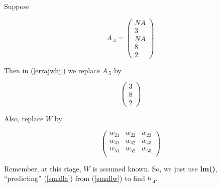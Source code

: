 Suppose

\begin{equation}
A_{.4} = 
\left (
\begin{array}{r}
NA \\
3 \\
NA \\
8 \\
2
\end{array}
\right )
\end{equation}

Then in (\ref{errajwhj}) we replace $A_{.5}$ by

\begin{equation}
\label{smalla}
\left (
\begin{array}{r}
3 \\
8 \\
2 
\end{array}
\right )
\end{equation}

Also, replace $W$ by

\begin{equation}
\label{smallw}
\left (
\begin{array}{rrr}
w_{21} & w_{22} & w_{23} \\
w_{41} & w_{42} & w_{43} \\
w_{51} & w_{52} & w_{53} \\
\end{array}
\right )
\end{equation}

Remember, at this stage, $W$ is assumed known.  So, we just use
\textbf{lm()}, ``predicting'' (\ref{smalla}) from (\ref{smallw}) to find
$h_{.4}$.


% 
% 
% 
% 
% 

